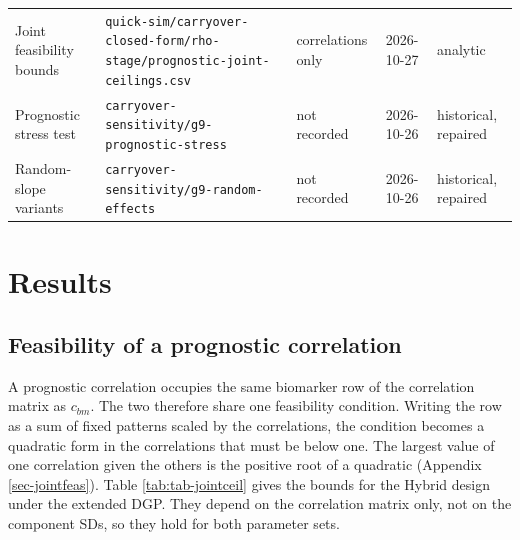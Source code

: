 \documentclass[
  11pt,
]{article}
\begin{document}
\begin{table}
{\begin{tabular}[t]{lllll}
\addlinespace
Joint feasibility bounds & \texttt{quick-sim/carryover-closed-form/rho-stage/prognostic-joint-ceilings.csv} & correlations only & 2026-10-27 & analytic\\
Prognostic stress test & \texttt{carryover-sensitivity/g9-prognostic-stress} & not recorded & 2026-10-26 & historical, repaired\\
Random-slope variants & \texttt{carryover-sensitivity/g9-random-effects} & not recorded & 2026-10-26 & historical, repaired\\
\bottomrule
\end{tabular}}
\end{table}

\section{Results}\label{sec-results}

\subsection{Feasibility of a prognostic correlation}\label{sec-feasibility}

A prognostic correlation occupies the same biomarker row of the
correlation matrix as \(c_{bm}\). The two therefore share one
feasibility condition. Writing the row as a sum of fixed patterns
scaled by the correlations, the condition becomes a quadratic form in
the correlations that must be below one. The largest value of one
correlation given the others is the positive root of a quadratic
(Appendix \ref{sec-jointfeas}). Table \ref{tab:tab-jointceil} gives
the bounds for the Hybrid design under the extended DGP. They depend
on the correlation matrix only, not on the component SDs, so they
hold for both parameter sets.
\end{document}
